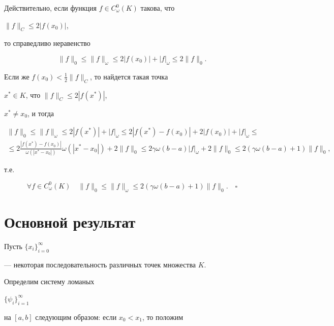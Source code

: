 Действительно, если функция $f\in C^0_\omega(K)$ такова, что


$\|f\|_C\le 2|f(x_0)|$,


то справедливо неравенство


$$


\|f\|_0\le \|f\|_\omega\le 2|f(x_0)|+|f|_\omega\le


2\|f\|_0.


$$


Если же $f(x_0)<\frac{1}{2}\|f\|_C$, то найдется такая точка


$x^*\in K$, что $\|f\|_C\le 2|f(x^*)|$,


$x^*\ne x_0$, и тогда


\begin{multline*}


\|f\|_0 \le \|f\|_\omega\le 2|f(x^*)|+|f|_\omega\le


2|f(x^*)-f(x_0)|+ 2|f(x_0)|+|f|_\omega \le \\


\le 2\frac{|f(x^*)-f(x_0)|}{\omega(|x^*-x_0|)}


\omega(|x^*-x_0|)+2\|f\|_0\le


2\gamma\omega(b-a)|f|_\omega+ 2\|f\|_0\le


2(\gamma\omega(b-a)+1)\|f\|_0,


\end{multline*}


т.е.


$$


\forall f\in C^0_\omega(K)\quad


\|f\|_0\le \|f\|_\omega\le


2(\gamma\omega(b-a)+1)\|f\|_0.\quad\square


$$





\section{Основной результат}





Пусть $\{x_i\}^\infty_{i=0}$


--- некоторая последовательность различных точек множества $K$.


Определим систему ломаных


$\{\psi_i\}^\infty_{i=1}$


на $[a,b]$ следующим образом: если $x_0<x_1$, то положим


